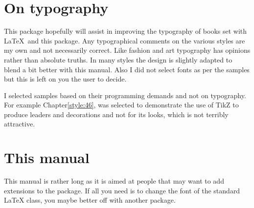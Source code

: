 \section{On typography}

This package hopefully will assist in improving the typography of books set with \LaTeX\ and this package. Any typographical comments on the various styles are my own and not necessarily correct. Like fashion and art typography has opinions rather than absolute truths. In many styles the design is slightly adapted to blend a bit better with this manual. Also I did not select fonts as per the samples but this is left on you the user to decide.

I selected samples based on their programming demands and not on  typography. For example Chapter\ref{style:46}, was selected to demonstrate the use of TikZ to produce leaders and decorations and not for its looks, which is not terribly attractive.

\section{This manual}

This manual is rather long as it is aimed at people that may want to add extensions to the package. If all you need is to change the font of the standard LaTeX class, you maybe better off with another package. 











